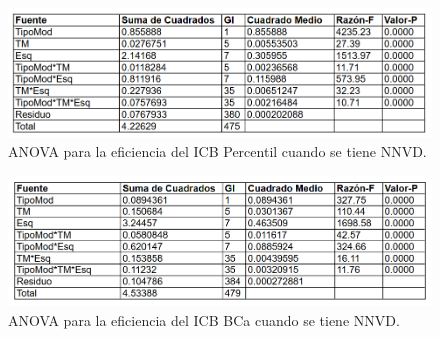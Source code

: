 \begin{figure}[ht] 
	\centering 
	\includegraphics[width=0.95\linewidth]{img/ANOVA_Efic_ICB_Perc_NNVD.png} 
	\caption{ANOVA para la eficiencia del ICB Percentil cuando se tiene NNVD.} 
	\label{fig:ANOVA_Efic_ICB_Perc_NNVD}
\end{figure}
\FloatBarrier


\begin{figure}[ht] 
	\centering 
	\includegraphics[width=0.95\linewidth]{img/ANOVA_Efic_ICB_BCa_NNVD.png} 
	\caption{ANOVA para la eficiencia del ICB BCa cuando se tiene NNVD.} 
	\label{fig:ANOVA_Efic_ICB_BCa_NNVD}
\end{figure}
\FloatBarrier
\clearpage